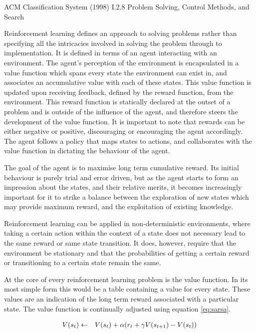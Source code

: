 \documentclass{rucsthesis}
\begin{document}
ACM Classification System (1998) I.2.8 Problem Solving, Control Methods, and Search

Reinforcement learning defines an approach to solving problems rather than specifying all the intricacies involved in solving the problem through to implementation. It is defined in terms of an agent interacting with an environment. The agent's perception of the environment is encapsulated in a value function which spans every state the environment can exist in, and associates an accumulative value with each of these states. This value function is updated upon receiving feedback, defined by the reward function, from the environment. This reward function is statically declared at the outset of a problem and is outside of the influence of the agent, and therefore steers the development of the value function. It is important to note that rewards can be either negative or positive, discouraging or encouraging the agent accordingly. The agent follows a policy that maps states to actions, and collaborates with the value function in dictating the behaviour of the agent\citep{suttonbarto}.

The goal of the agent is to maximise long term cumulative reward. Its initial behaviour is purely trial and error driven, but as the agent starts to form an impression about the states, and their relative merits, it becomes increasingly important for it to strike a balance between the exploration of new states which may provide maximum reward, and the exploitation of existing knowledge\citep{suttonbarto}.

Reinforcement learning can be applied in non-deterministic environments, where taking a certain action within the context of a state does not necessary lead to the same reward or same state transition. It does, however, require that the environment be stationary and that the probabilities of getting a certain reward or transitioning to a certain state remain the same\citep{kaelbling96reinforcement}.

At the core of every reinforcement learning problem is the value function. In its most simple form this would be a table containing a value for every state. These values are an indication of the long term reward associated with a particular state. The value function is continually adjusted using equation \ref{eq:sarsa}. 

\begin{eqnarray}
\centering
V(s_t) & \leftarrow & V(s_t) + \alpha(r_{t} + \gamma V(s_{t+1}) - V(s_t)) \label{eq:sarsa}
\end{eqnarray}
\end{document}
